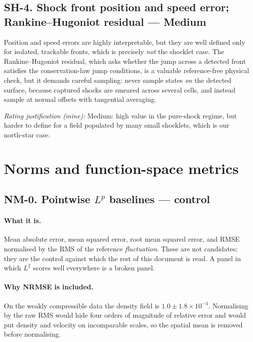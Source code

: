 \documentclass[11pt]{article}
\newcommand{\Med}{Medium}
\newcommand{\rating}[1]{\par\smallskip\noindent\textit{Rating justification (mine):} #1}
\begin{document}
\subsection{SH-4. Shock front position and speed error; Rankine--Hugoniot residual --- \Med{}}

Position and speed errors are highly interpretable, but they are well defined only for
isolated, trackable fronts, which is precisely \emph{not} the shocklet case. The
Rankine--Hugoniot residual, which asks whether the jump across a detected front satisfies
the conservation-law jump conditions, is a valuable reference-free physical check, but it
demands careful sampling: never sample states \emph{on} the detected surface, because
captured shocks are smeared across several cells, and instead sample at normal offsets with
tangential averaging.

\rating{Medium: high value in the pure-shock regime, but harder to define for a field
populated by many small shocklets, which is our north-star case.}

\section{Norms and function-space metrics}

\subsection{NM-0. Pointwise $L^p$ baselines --- control}
\label{sec:nm0}

\paragraph{What it is.} Mean absolute error, mean squared error, root mean squared error,
and RMSE normalised by the RMS of the reference \emph{fluctuation}. These are not
candidates; they are the control against which the rest of this document is read. A panel
in which $L^2$ scores well everywhere is a broken panel.

\paragraph{Why NRMSE is included.} On the weakly compressible data the density field is
$1.0 \pm 1.8\times10^{-4}$. Normalising by the raw RMS would hide four orders of magnitude
of relative error and would put density and velocity on incomparable scales, so the spatial
mean is removed before normalising.
\end{document}
